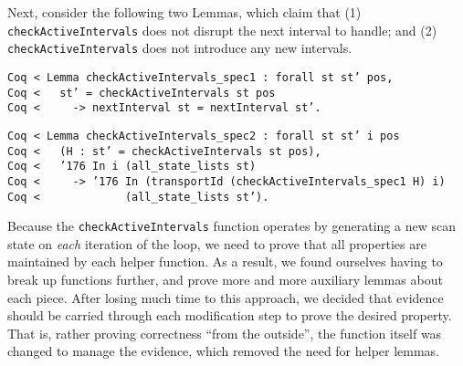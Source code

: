 \documentclass{llncs}
\begin{document}
Next, consider the following two Lemmas, which claim that (1)
\texttt{checkActiveIntervals} does not disrupt the next interval to
handle; and (2) \texttt{checkActiveIntervals} does not introduce any
new intervals.


\begin{flushleft}
\texttt{Coq~{<}~Lemma~checkActiveIntervals\_spec1~:~forall~st~st'~pos,}\\
\texttt{Coq~{<}~~~st'~=~checkActiveIntervals~st~pos}\\
\texttt{Coq~{<}~~~~~-{>}~nextInterval~st~=~nextInterval~st'.}\\
\end{flushleft}

\begin{flushleft}
\texttt{Coq~{<}~Lemma~checkActiveIntervals\_spec2~:~forall~st~st'~i~pos}\\
\texttt{Coq~{<}~~~(H~:~st'~=~checkActiveIntervals~st~pos),}\\
\texttt{Coq~{<}~~~{\char'176}~In~i~(all\_state\_lists~st)}\\
\texttt{Coq~{<}~~~~~-{>}~{\char'176}~In~(transportId~(checkActiveIntervals\_spec1~H)~i)}\\
\texttt{Coq~{<}~~~~~~~~~~~~~(all\_state\_lists~st').}\\
\end{flushleft}

Because the \texttt{checkActiveIntervals} function operates by
generating a new scan state on \emph{each} iteration of the loop, we
need to prove that all properties are maintained by each helper
function. 
%
%
As a result, we found ourselves having to break up functions further, and
prove more and more auxiliary lemmas about each piece.  After losing much time
to this approach, we decided that evidence should be carried through each
modification step to prove the desired property.  That is, rather proving
correctness ``from the outside'', the function itself was changed to manage
the evidence, which removed the need for helper lemmas.
\end{document}
